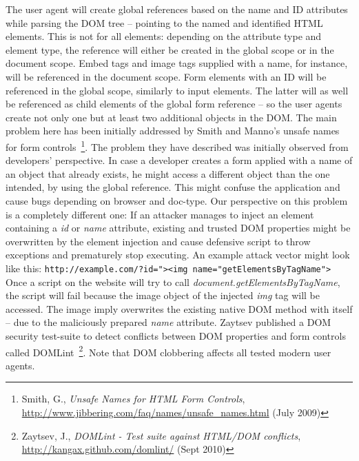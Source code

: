     The user agent will create global references based on the name and ID attributes while parsing the DOM tree -- pointing to the named and identified HTML elements. This is not for all elements: depending on the attribute type and element type, the reference will either be created in the global scope or in the document scope. Embed tags and image tags supplied with a name, for instance, will be referenced in the document scope. Form elements with an ID will be referenced in the global scope, similarly to input elements. The latter will as well be referenced as child elements of the global form reference -- so the user agents create not only one but at least two additional objects in the DOM. The main problem here has been initially addressed by Smith and Manno's unsafe names for form controls~\footnote{Smith, G., \textit{Unsafe Names for HTML Form Controls}, \url{http://www.jibbering.com/faq/names/unsafe_names.html} (July 2009)}. The problem they have described was initially observed from developers' 
perspective. In case a developer creates a form applied with a name of an object that already exists, he might access a different object than the one intended, by using the global reference. This might confuse the application and cause bugs depending on browser and doc-type. Our perspective on this problem is a completely different one: If an attacker manages to inject an element containing a \textit{id} or \textit{name} attribute, existing and trusted DOM properties might be overwritten by the element injection and cause defensive script to throw exceptions and prematurely stop executing. An example attack vector might look like this: \texttt{http://example.com/?id="><img name="getElementsByTagName">} Once a script on the website will try to call \textit{document.getElementsByTagName}, the script will fail because the image object of the injected \textit{img} tag will be accessed. The image imply overwrites the existing native DOM method with itself -- due to the maliciously prepared \textit{name} attribute.
 Zaytsev published a DOM security test-suite to detect conflicts between DOM properties and form controls called DOMLint~\footnote{Zaytsev, J., \textit{DOMLint - Test suite against HTML/DOM conflicts}, \url{http://kangax.github.com/domlint/} (Sept 2010)}. Note that DOM clobbering affects all tested modern user agents.\\

